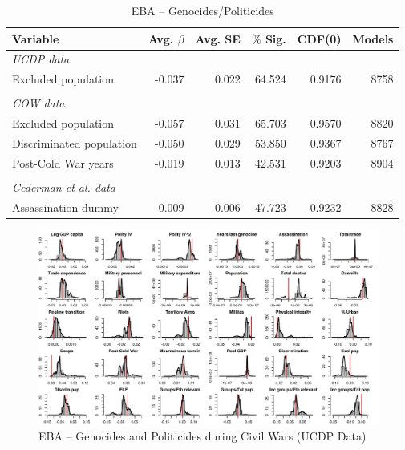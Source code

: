 \documentclass[a4paper,12pt]{article}
\begin{document}
\begin{table}[H]
\centering
\begin{tabular}{lrrrrr}
\hline
\textbf{Variable} & \textbf{Avg. $\beta$} & \textbf{Avg. SE} & \textbf{$\%$ Sig.} & \textbf{CDF(0)} & \textbf{Models} \\ \hline
\textit{UCDP data} &  &  &  &  &  \\
Excluded population & -0.037 & 0.022 & 64.524 & 0.9176 & 8758 \\
 &  &  &  &  &  \\
\textit{COW data} &  &  &  &  &  \\
Excluded population & -0.057 & 0.031 & 65.703 & 0.9570 & 8820 \\
Discriminated population & -0.050 & 0.029 & 53.850 & 0.9367 & 8767 \\
Post-Cold War years & -0.019 & 0.013 & 42.531 & 0.9203 & 8904 \\
 &  &  &  &  &  \\
\textit{Cederman et al. data} &  &  &  &  &  \\
Assassination dummy & -0.009 & 0.006 & 47.723 & 0.9232 & 8828 \\ \hline
\end{tabular}
\caption{EBA -- Genocides/Politicides}
\label{tab:uamk1}
\end{table}

\newpage
\begin{figure}
    \centering
    \includegraphics[width=.98\textheight, angle=90]{images/uamk-ucdp.pdf}
    \caption{EBA -- Genocides and Politicides during Civil Wars (UCDP Data)}
    \label{fig:uamk-ucdp}
\end{figure}
\end{document}
